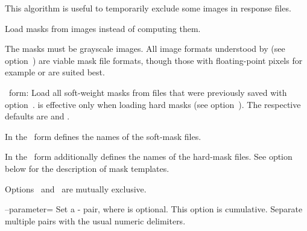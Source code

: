 \begin{codelist}
\begin{codelist}
    This algorithm is useful to temporarily exclude some images in response files.
  \end{codelist}


\ifenfuse
  \label{opt:load-masks}%
  \item[\itempar{--load-masks~\textrm{(\oldstylefirst~form)}
      \\ --load-masks=\metavar{SOFT-MASK-TEMPLATE}~\textrm{(\oldstylesecond~form)}
      \\ --load-masks=\metavar{SOFT-MASK-TEMPLATE}:\feasiblebreak
      \metavar{HARD-MASK-TEMPLATE}~\textrm{(\oldstylethird~form)}}]\itemend
    Load masks from images instead of
    computing them.

    The masks must be grayscale images.  All image formats understood by \App{} (see
    option~) are viable mask
    file formats, though those with floating-point pixels for example  or
     are suited best.

    \begin{sloppypar}
      \oldstylefirst~form: Load all soft-weight masks from files that were previously saved with
      option~.  
      is effective only when loading hard masks (see
      option~).  The respective defaults are
      \mbox{} and
      \mbox{}.

      In the \oldstylesecond~form  defines the names of
      the soft-mask files.

      In the \oldstylethird~form  additionally defines the
      names of the hard-mask files.  See
      option~ below for the description of
      mask templates.
    \end{sloppypar}

    Options~ and~ are mutually exclusive.
\fi


  \label{opt:parameter}%
\item[--parameter=\metavar{KEY}\optional{=\metavar{VALUE}}\optional{:\dots}]\itemend
  Set a - pair, where  is optional.  This option is
  cumulative.  Separate multiple pairs with the usual numeric delimiters.


\end{codelist}
